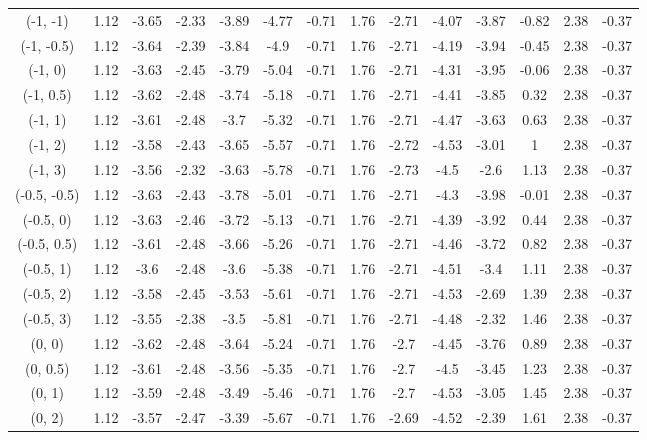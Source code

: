 \documentclass[11pt,a4paper,twoside,openany]{book}\usepackage{knitr}
\begin{document}
{{\begin{knitrout}
\begin{landscape}
\begin{longtable}[t]{cccccccccccccc}
(-1, -1) & 1.12 & -3.65 & -2.33 & -3.89 & -4.77 & -0.71 & 1.76 & -2.71 & -4.07 & -3.87 & -0.82 & 2.38 & -0.37\\
(-1, -0.5) & 1.12 & -3.64 & -2.39 & -3.84 & -4.9 & -0.71 & 1.76 & -2.71 & -4.19 & -3.94 & -0.45 & 2.38 & -0.37\\
\addlinespace
(-1, 0) & 1.12 & -3.63 & -2.45 & -3.79 & -5.04 & -0.71 & 1.76 & -2.71 & -4.31 & -3.95 & -0.06 & 2.38 & -0.37\\
(-1, 0.5) & 1.12 & -3.62 & -2.48 & -3.74 & -5.18 & -0.71 & 1.76 & -2.71 & -4.41 & -3.85 & 0.32 & 2.38 & -0.37\\
(-1, 1) & 1.12 & -3.61 & -2.48 & -3.7 & -5.32 & -0.71 & 1.76 & -2.71 & -4.47 & -3.63 & 0.63 & 2.38 & -0.37\\
(-1, 2) & 1.12 & -3.58 & -2.43 & -3.65 & -5.57 & -0.71 & 1.76 & -2.72 & -4.53 & -3.01 & 1 & 2.38 & -0.37\\
(-1, 3) & 1.12 & -3.56 & -2.32 & -3.63 & -5.78 & -0.71 & 1.76 & -2.73 & -4.5 & -2.6 & 1.13 & 2.38 & -0.37\\
\addlinespace
(-0.5, -0.5) & 1.12 & -3.63 & -2.43 & -3.78 & -5.01 & -0.71 & 1.76 & -2.71 & -4.3 & -3.98 & -0.01 & 2.38 & -0.37\\
(-0.5, 0) & 1.12 & -3.63 & -2.46 & -3.72 & -5.13 & -0.71 & 1.76 & -2.71 & -4.39 & -3.92 & 0.44 & 2.38 & -0.37\\
(-0.5, 0.5) & 1.12 & -3.61 & -2.48 & -3.66 & -5.26 & -0.71 & 1.76 & -2.71 & -4.46 & -3.72 & 0.82 & 2.38 & -0.37\\
(-0.5, 1) & 1.12 & -3.6 & -2.48 & -3.6 & -5.38 & -0.71 & 1.76 & -2.71 & -4.51 & -3.4 & 1.11 & 2.38 & -0.37\\
(-0.5, 2) & 1.12 & -3.58 & -2.45 & -3.53 & -5.61 & -0.71 & 1.76 & -2.71 & -4.53 & -2.69 & 1.39 & 2.38 & -0.37\\
\addlinespace
(-0.5, 3) & 1.12 & -3.55 & -2.38 & -3.5 & -5.81 & -0.71 & 1.76 & -2.71 & -4.48 & -2.32 & 1.46 & 2.38 & -0.37\\
(0, 0) & 1.12 & -3.62 & -2.48 & -3.64 & -5.24 & -0.71 & 1.76 & -2.7 & -4.45 & -3.76 & 0.89 & 2.38 & -0.37\\
(0, 0.5) & 1.12 & -3.61 & -2.48 & -3.56 & -5.35 & -0.71 & 1.76 & -2.7 & -4.5 & -3.45 & 1.23 & 2.38 & -0.37\\
(0, 1) & 1.12 & -3.59 & -2.48 & -3.49 & -5.46 & -0.71 & 1.76 & -2.7 & -4.53 & -3.05 & 1.45 & 2.38 & -0.37\\
(0, 2) & 1.12 & -3.57 & -2.47 & -3.39 & -5.67 & -0.71 & 1.76 & -2.69 & -4.52 & -2.39 & 1.61 & 2.38 & -0.37\\

\end{longtable}
\end{landscape}
\end{knitrout}}}
\end{document}
